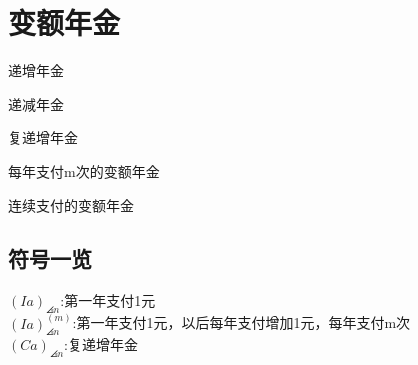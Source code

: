 \chapter{变额年金}
\begin{introduction}
	\item 递增年金
	\item 递减年金
	\item 复递增年金
	\item 每年支付m次的变额年金
	\item 连续支付的变额年金
\end{introduction}
\section{符号一览}
\noindent $(Ia)_{\angles{n}}$:第一年支付1元\\
$(Ia)^{(m)}_{\angles{n}}$:第一年支付1元，以后每年支付增加1元，每年支付m次
\\$(Ca)_{\angles{n}}$:复递增年金
